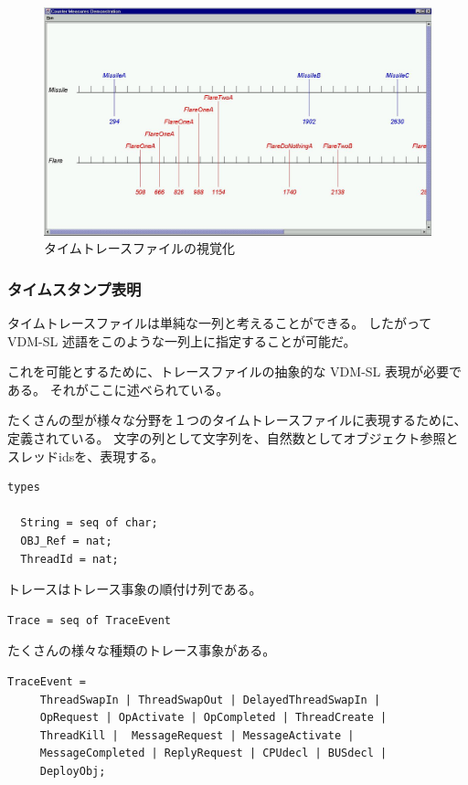\documentclass[\pformat,12pt]{jreport}
\begin{document}
\begin{figure}
\begin{center}
\includegraphics[width=\textwidth]{bespokemissile}
\end{center}
\caption{タイムトレースファイルの視覚化\label{fig:vistrace}}
\end{figure}

\subsubsection{タイムスタンプ表明}

タイムトレースファイルは単純な一列と考えることができる。
したがって VDM-SL 述語をこのような一列上に指定することが可能だ。

これを可能とするために、トレースファイルの抽象的な VDM-SL 表現が必要である。
それがここに述べられている。

たくさんの型が様々な分野を１つのタイムトレースファイルに表現するために、定義されている。
文字の列として文字列を、自然数としてオブジェクト参照とスレッドidsを、表現する。

\begin{lstlisting}
types

  String = seq of char;
  OBJ_Ref = nat;
  ThreadId = nat;
\end{lstlisting}

トレースはトレース事象の順付け列である。

\begin{lstlisting}
Trace = seq of TraceEvent
\end{lstlisting}

たくさんの様々な種類のトレース事象がある。

\begin{lstlisting}
TraceEvent = 
     ThreadSwapIn | ThreadSwapOut | DelayedThreadSwapIn |
     OpRequest | OpActivate | OpCompleted | ThreadCreate |
     ThreadKill |  MessageRequest | MessageActivate |
     MessageCompleted | ReplyRequest | CPUdecl | BUSdecl |
     DeployObj; 
\end{lstlisting}
\end{document}
